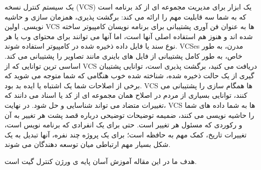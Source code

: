 \linespread{0.8}
\baselineskip=0.8cm




\TitlePageFa
\BesmellahPage
\ThesisBioPage
   


\begin{AbstractFa}
 یک سیستم کنترل نسخه (VCS) یک ابزار برای مدیریت مجموعه ای از کد برنامه است که به شما سه قابلیت مهم را ارائه می کند: برگشت پذیری، همزمان سازی و حاشیه نویسی.
 \newline
 اولین VCS ها به عنوان فن آوری پشتیبانی برای برنامه نویسان کامپیوتر ساخته شده اند و هنوز هم استفاده اصلی آنها است، اما آنها می توانند برای محتوای وب یا هر نوع سند یا فایل داده ذخیره شده در کامپیوتر استفاده شوند. VCSes مدرن، به طور خاص، به طور کامل پشتیبانی از فایل های باینری مانند تصاویر را پشتیبانی می کند.
 \newline
 اساسی ترین توانایی که از VCS دریافت می کنید، برگشت پذیری است، توانایی پشتیبان گیری از یک حالت ذخیره شده، شناخته شده خوب هنگامی که شما متوجه می شوید که برخی از اصلاحات شما یک اشتباه یا ایده بد بود.
 \newline
 VCS ها همگام سازی را پشتیبانی می کنند، توانایی بسیاری از مردم در اصلاح همان مجموعه ای از کد یا اسناد می دانند که تغییرات متضاد می تواند شناسایی و حل شود.
 \newline
 در نهایت،  VCS ها به شما  داده های شما را حاشیه نویسی می کنند، ضمیمه توضیحات توضیحی درباره قصد پشت هر تغییر به آن و رکوردی که مسئول هر تغییر است. حتی برای یک انفرادی که برنامه نویس است، تغییرات تاریخ، کمک مهم به حافظه است؛ برای یک پروژه چند نفره، آنها تبدیل به یک شکل بسیار مهم ارتباطی میان توسعه دهندگان می شوند.\newline
 
 هدف ما در این مقاله آموزش آسان پایه ی ورژن کنترل گیت است.
\end{AbstractFa}



\OathPage 
\CopyRightPage  








\tableofcontents{}\newpage
\listoffigures\newpage

\newpage

